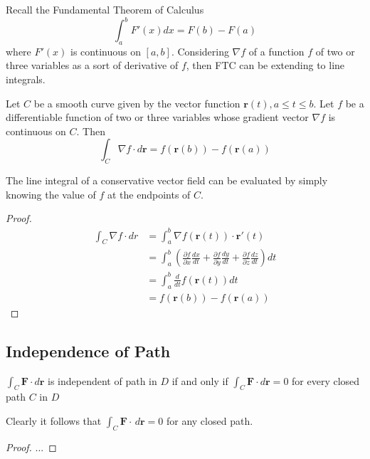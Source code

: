 \documentclass[../main.tex]{subfiles}
\begin{document}
Recall the Fundamental Theorem of Calculus
\begin{equation*}
\int_a^b{F'(x) dx} = F(b) - F(a)
\end{equation*}
where $F'(x)$ is continuous on $[a,b]$. Considering $\nabla f$ of a function $f$ of two or three variables as a sort of derivative of $f$, then FTC can be extending to line integrals.

\begin{theorem}
Let $C$ be a smooth curve given by the vector function $\textbf{r}(t), a\le t \le b$. Let $f$ be a differentiable function of two or three variables whose gradient vector $\nabla f$ is continuous on $C$. Then
\begin{equation*}
\int_C{\nabla f \cdot d\textbf{r}}=f(\textbf{r}(b)) - f(\textbf{r}(a))
\end{equation*}
\end{theorem}
The line integral of a conservative vector field can be evaluated by simply knowing the value of $f$ at the endpoints of $C$.
\begin{proof}
\begin{align*}
\int_C{\nabla f\cdot dr} &= \int_a^b{\nabla f(\textbf{r}(t))\cdot \textbf{r}'(t)} \\
	&= \int_a^b{(\frac{\partial f}{\partial x}\frac{dx}{dt} + \frac{\partial f}{\partial y}\frac{dy}{dt} +\frac{\partial f}{\partial z}\frac{dz}{dt}) dt}\\
	&=\int_a^b{\frac{d}{dt}f(\textbf{r}(t))dt}\\
	&= f(\textbf{r}(b)) - f(\textbf{r}(a))
\end{align*}
\end{proof}

\subsection{Independence of Path}
\begin{theorem}
$\int_C{\textbf{F}\cdot d\textbf{r}}$ is independent of path in $D$ if and only if $\int_C{\textbf{F}\cdot d\textbf{r}}=0$ for every closed path $C$ in $D$
\end{theorem}
Clearly it follows that $\int_C{\textbf{F}\cdot\,d\textbf{r}}=0$ for any closed path.
\begin{proof}
...
\end{proof}
\end{document}
